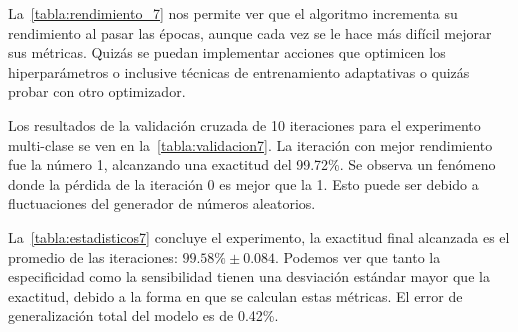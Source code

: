La~\autoref{tabla:rendimiento_7} nos permite ver que el algoritmo incrementa su
rendimiento al pasar las épocas, aunque cada vez se le hace más difícil mejorar
sus métricas. Quizás se puedan implementar acciones que optimicen los
hiperparámetros o inclusive técnicas de entrenamiento adaptativas o quizás
probar con otro optimizador.

Los resultados de la validación cruzada de 10 iteraciones para el experimento
multi-clase se ven en la~\autoref{tabla:validacion7}. La iteración con mejor
rendimiento fue la número 1, alcanzando una exactitud del 99.72\%. Se observa
un fenómeno donde la pérdida de la iteración 0 es mejor que la 1. Esto puede
ser debido a fluctuaciones del generador de números aleatorios.

\begin{table}[H]
    \centering
    \caption{Resultados de la validación cruzada multi-clase}
    \label{tabla:validacion7}
    \end{table}

La~\autoref{tabla:estadisticos7} concluye el experimento, la exactitud final
alcanzada es el promedio de las iteraciones: $99.58\% \pm 0.084$. Podemos ver
que tanto la especificidad como la sensibilidad tienen una desviación estándar
mayor que la exactitud, debido a la forma en que se calculan estas métricas. El
error de generalización total del modelo es de 0.42\%.

